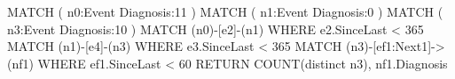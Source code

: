 MATCH ( n0:Event { Diagnosis:11 }) 
MATCH ( n1:Event { Diagnosis:0  })
MATCH ( n3:Event { Diagnosis:10 })
MATCH (n0)-[e2]-(n1)
	WHERE e2.SinceLast < 365
MATCH (n1)-[e4]-(n3)
	WHERE e3.SinceLast < 365
MATCH (n3)-[ef1:Next1]->(nf1)
	WHERE ef1.SinceLast < 60
RETURN COUNT(distinct n3), nf1.Diagnosis 